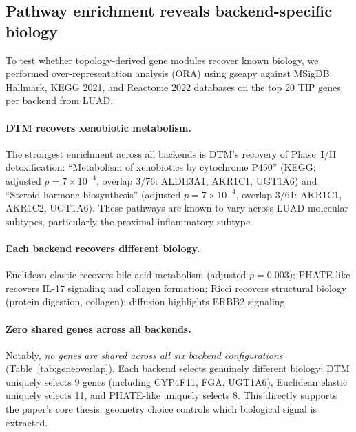 \documentclass[11pt]{article}
\begin{document}
\subsection{Pathway enrichment reveals backend-specific biology}
\label{sec:enrichment}

To test whether topology-derived gene modules recover known biology, we performed over-representation analysis (ORA) using gseapy \cite{gseapy} against MSigDB Hallmark, KEGG 2021, and Reactome 2022 databases on the top 20 TIP genes per backend from LUAD.

\paragraph{DTM recovers xenobiotic metabolism.}
The strongest enrichment across all backends is DTM's recovery of Phase~I/II detoxification: ``Metabolism of xenobiotics by cytochrome P450'' (KEGG; adjusted $p = 7 \times 10^{-4}$, overlap 3/76: ALDH3A1, AKR1C1, UGT1A6) and ``Steroid hormone biosynthesis'' (adjusted $p = 7 \times 10^{-4}$, overlap 3/61: AKR1C1, AKR1C2, UGT1A6).
These pathways are known to vary across LUAD molecular subtypes, particularly the proximal-inflammatory subtype.

\paragraph{Each backend recovers different biology.}
Euclidean elastic recovers bile acid metabolism (adjusted $p = 0.003$); PHATE-like recovers IL-17 signaling and collagen formation; Ricci recovers structural biology (protein digestion, collagen); diffusion highlights ERBB2 signaling.

\paragraph{Zero shared genes across all backends.}
Notably, \emph{no genes are shared across all six backend configurations} (Table~\ref{tab:geneoverlap}).
Each backend selects genuinely different biology: DTM uniquely selects 9 genes (including CYP4F11, FGA, UGT1A6), Euclidean elastic uniquely selects 11, and PHATE-like uniquely selects 8.
This directly supports the paper's core thesis: geometry choice controls which biological signal is extracted.
\end{document}
